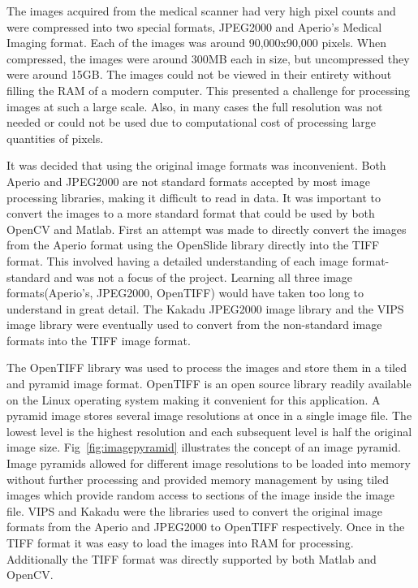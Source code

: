 \documentclass[letterpaper,10pt,oneside]{article}
\begin{document}
The images acquired from the medical scanner had very high pixel counts and were compressed into two special formats, JPEG2000 and Aperio's Medical Imaging format. Each of the images was around 90,000x90,000 pixels. When compressed, the images were around 300MB each in size, but uncompressed they were around 15GB. The images could not be viewed in their entirety without filling the RAM of a modern computer. This presented a challenge for processing images at such a large scale. Also, in many cases the full resolution was not needed or could not be used due to computational cost of processing large quantities of pixels.

It was decided that using the original image formats was inconvenient. Both Aperio and JPEG2000 are not standard formats accepted by most image processing libraries, making it difficult to read in data. It was important to convert the images to a more standard format that could be used by both OpenCV and Matlab. First an attempt was made to directly convert the images from the Aperio format using the OpenSlide library directly into the TIFF format. This involved having a detailed understanding of each image format-standard and was not a focus of the project. Learning all three image formats(Aperio's, JPEG2000, OpenTIFF) would have taken too long to understand in great detail. The Kakadu JPEG2000 image library and the VIPS image library were eventually used to convert from the non-standard image formats into the TIFF image format.

The OpenTIFF library was used to process the images and store them in a tiled and pyramid image format. OpenTIFF is an open source library readily available on the Linux operating system making it convenient for this application. A pyramid image stores several image resolutions at once in a single image file. The lowest level is the highest resolution and each subsequent level is half the original image size. Fig~\ref{fig:imagepyramid} illustrates the concept of an image pyramid. Image pyramids allowed for different image resolutions to be loaded into memory without further processing and provided memory management by using tiled images which provide random access to sections of the image inside the image file. VIPS and Kakadu were the libraries used to convert the original image formats from the Aperio and JPEG2000 to OpenTIFF respectively. Once in the TIFF format it was easy to load the images into RAM for processing. Additionally the TIFF format was directly supported by both Matlab and OpenCV.
\end{document}
